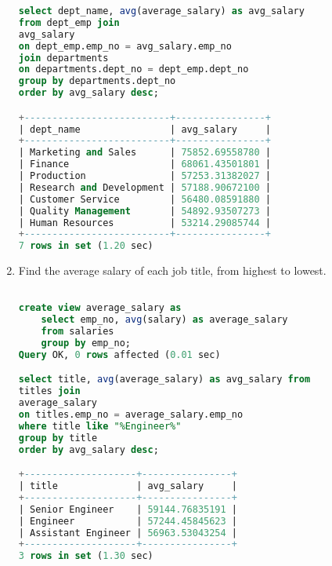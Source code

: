 \documentclass[12pt]{article}
\begin{document}
\begin{enumerate}
\begin{lstlisting}[language=SQL]
select dept_name, avg(average_salary) as avg_salary
from dept_emp join
avg_salary
on dept_emp.emp_no = avg_salary.emp_no
join departments
on departments.dept_no = dept_emp.dept_no
group by departments.dept_no
order by avg_salary desc;

+--------------------------+----------------+
| dept_name                | avg_salary     |
+--------------------------+----------------+
| Marketing and Sales      | 75852.69558780 |
| Finance                  | 68061.43501801 |
| Production               | 57253.31382027 |
| Research and Development | 57188.90672100 |
| Customer Service         | 56480.08591880 |
| Quality Management       | 54892.93507273 |
| Human Resources          | 53214.29085744 |
+--------------------------+----------------+
7 rows in set (1.20 sec)

\end{lstlisting}


\item Find the average salary of each job title, from highest to lowest.

\begin{lstlisting}[language=SQL]

create view average_salary as
	select emp_no, avg(salary) as average_salary
	from salaries 
	group by emp_no;
Query OK, 0 rows affected (0.01 sec)

select title, avg(average_salary) as avg_salary from
titles join
average_salary
on titles.emp_no = average_salary.emp_no
where title like "%Engineer%"
group by title
order by avg_salary desc;

+--------------------+----------------+
| title              | avg_salary     |
+--------------------+----------------+
| Senior Engineer    | 59144.76835191 |
| Engineer           | 57244.45845623 |
| Assistant Engineer | 56963.53043254 |
+--------------------+----------------+
3 rows in set (1.30 sec)



\end{lstlisting}






\end{enumerate}



 
\end{document}

